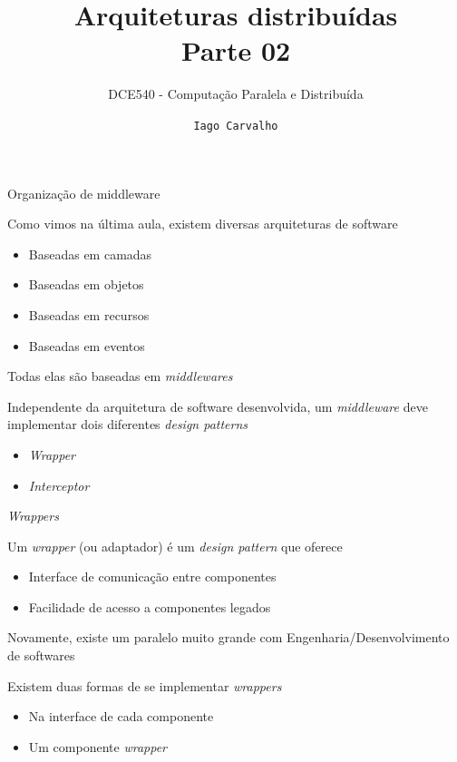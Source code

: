 \documentclass[compress]{beamer}
\title{Arquiteturas distribuídas \\ Parte 02}
\subtitle{DCE540 - Computação Paralela e Distribuída}
\author{\texttt{Iago Carvalho}}
\institute{\texttt{Departamento de Ciência da Computação}}
\begin{document}
\begin{frame}
\titlepage

\end{frame}


\begin{frame}{Organização de middleware}

Como vimos na última aula, existem diversas arquiteturas de software
\begin{itemize}
    \item Baseadas em camadas
    \item Baseadas em objetos
    \item Baseadas em recursos
    \item Baseadas em eventos
\end{itemize}

Todas elas são baseadas em \textit{middlewares}

Independente da arquitetura de software desenvolvida, um \textit{middleware} deve implementar dois diferentes \textit{design patterns}
\begin{itemize}
    \item \textit{Wrapper} 
    \item \textit{Interceptor}
\end{itemize}
\end{frame}



\begin{frame}{\textit{Wrappers}}

Um \textit{wrapper} (ou adaptador) é um \textit{design pattern} que oferece
\begin{itemize}
    \item Interface de comunicação entre componentes
    \item Facilidade de acesso a componentes legados
\end{itemize}

\vspace{0.5cm}

Novamente, existe um paralelo muito grande com Engenharia/Desenvolvimento de softwares

\vspace{0.5cm}

Existem duas formas de se implementar \textit{wrappers}
\begin{itemize}
    \item Na interface de cada componente
    \item Um componente \textit{wrapper}
\end{itemize}

\end{frame}
\end{document}
